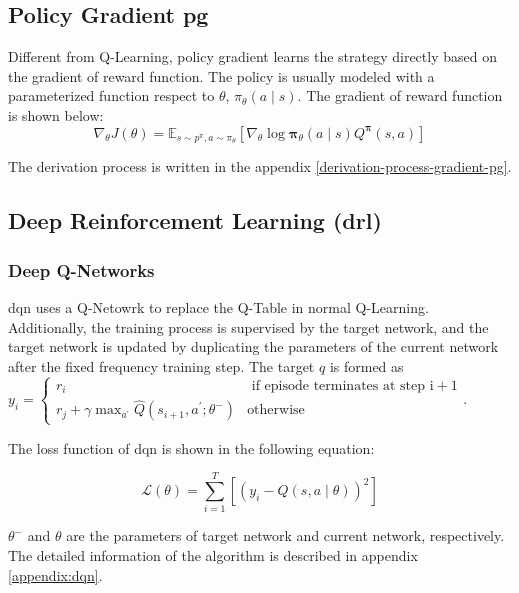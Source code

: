 \subsection{Policy Gradient \gls{pg}}
Different from Q-Learning, policy gradient learns the strategy directly based on the gradient of reward function. The policy is usually modeled with a parameterized function respect to $\theta$, $\pi_\theta \left(a \mid s\right)$. The gradient of reward function is shown below:
\begin{equation}
\nabla_{\theta} J(\theta)=\mathbb{E}_{s \sim p^{\pi}, a \sim \pi_{\theta}}\left[\nabla_{\theta} \log \boldsymbol{\pi}_{\theta}(a \mid s) Q^{\boldsymbol{\pi}}(s, a)\right]
\end{equation}

The derivation process is written in the appendix \ref{derivation-process-gradient-pg}.

\subsection{Deep Reinforcement Learning (\gls{drl})}
\subsubsection{Deep Q-Networks}
\gls{dqn} uses a Q-Netowrk to replace the Q-Table in normal Q-Learning. Additionally, the training process is supervised by the target network, and the target network is updated by duplicating the parameters of the current network after the fixed frequency training step. The target $q$ is formed as $y_{i}=\left\{\begin{array}{cc}r_{i} & \text { if episode terminates at step } \mathrm{i}+1 \\ r_{j}+\gamma \max _{a^{\prime}} \hat{Q}\left(s_{i+1}, a^{\prime} ; \theta^{-}\right) & \text {otherwise }\end{array}\right.$.

The loss function of \gls{dqn} is shown in the following equation:

\begin{equation}
\mathcal{L}(\theta)=\sum_{i=1}^{T}\left[\left(y_{i}-Q(s, a \mid \theta)\right)^{2}\right]
\end{equation}

$\theta^{-}$ and $\theta$ are the parameters of target network and current network, respectively. The detailed information of the algorithm is described in appendix \ref{appendix:dqn}.

